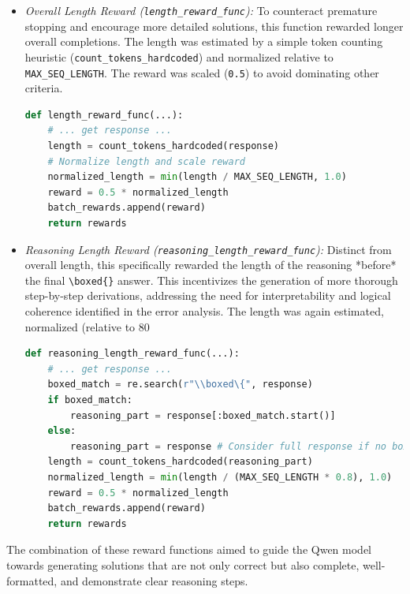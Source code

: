 \documentclass[11pt]{article}
\begin{document}
\begin{itemize}
\begin{itemize}
            \item \textit{Overall Length Reward (\texttt{length\_reward\_func}):} To counteract premature stopping and encourage more detailed solutions, this function rewarded longer overall completions. The length was estimated by a simple token counting heuristic (\texttt{count\_tokens\_hardcoded}) and normalized relative to \texttt{MAX\_SEQ\_LENGTH}. The reward was scaled (\texttt{0.5}) to avoid dominating other criteria.
\begin{lstlisting}[language=Python, caption={Core logic for Overall Length reward (Qwen)}, label={lst:qwen_correct}]
def length_reward_func(...):
    # ... get response ...
    length = count_tokens_hardcoded(response)
    # Normalize length and scale reward
    normalized_length = min(length / MAX_SEQ_LENGTH, 1.0)
    reward = 0.5 * normalized_length
    batch_rewards.append(reward)
    return rewards
\end{lstlisting}

            \item \textit{Reasoning Length Reward (\texttt{reasoning\_length\_reward\_func}):} Distinct from overall length, this specifically rewarded the length of the reasoning *before* the final \verb|\boxed{}| answer. This incentivizes the generation of more thorough step-by-step derivations, addressing the need for interpretability and logical coherence identified in the error analysis. The length was again estimated, normalized (relative to 80%
\begin{lstlisting}[language=Python, caption={Core logic for Reasoning Length Reward (Qwen)}, label={lst:qwen_correct}]
def reasoning_length_reward_func(...):
    # ... get response ...
    boxed_match = re.search(r"\\boxed\{", response)
    if boxed_match:
        reasoning_part = response[:boxed_match.start()]
    else:
        reasoning_part = response # Consider full response if no box
    length = count_tokens_hardcoded(reasoning_part)
    normalized_length = min(length / (MAX_SEQ_LENGTH * 0.8), 1.0)
    reward = 0.5 * normalized_length
    batch_rewards.append(reward)
    return rewards
\end{lstlisting}
        \end{itemize}
    The combination of these reward functions aimed to guide the Qwen model towards generating solutions that are not only correct but also complete, well-formatted, and demonstrate clear reasoning steps.


\end{itemize}
\end{document}
